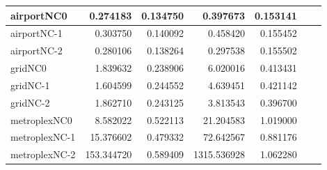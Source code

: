 \begin{longtable}{|l|r|r|r|r|r|r|}
airportNC0 & 0.274183 & 0.134750 & 0.397673 & 0.153141 \\ \hline
airportNC-1 & 0.303750 & 0.140092 & 0.458420 & 0.155452 \\ \hline
airportNC-2 & 0.280106 & 0.138264 & 0.297538 & 0.155502 \\ \hline
gridNC0 & 1.839632 & 0.238906 & 6.020016 & 0.413431 \\ \hline
gridNC-1 & 1.604599 & 0.244552 & 4.639451 & 0.421142 \\ \hline
gridNC-2 & 1.862710 & 0.243125 & 3.813543 & 0.396700 \\ \hline
metroplexNC0 & 8.582022 & 0.522113 & 21.204583 & 1.019000 \\ \hline
metroplexNC-1 & 15.376602 & 0.479332 & 72.642567 & 0.881176 \\ \hline
metroplexNC-2 & 153.344720 & 0.589409 & 1315.536928 & 1.062280 \\ \hline
\end{longtable}
